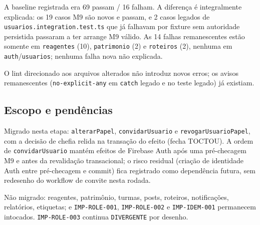 A baseline registrada era 69 passam / 16 falham. A diferença é integralmente
explicada: os 19 casos M9 são novos e passam, e 2 casos legados de
\texttt{usuarios.integration.test.ts} que já falhavam por fixture sem autoridade
persistida passaram a ter arrange M9 válido. As 14 falhas remanescentes estão
somente em \texttt{reagentes} (10), \texttt{patrimonio} (2) e \texttt{roteiros}
(2), nenhuma em \texttt{auth}/\texttt{usuarios}; nenhuma falha nova não explicada.

O lint direcionado aos arquivos alterados não introduz novos erros; os avisos
remanescentes (\texttt{no-explicit-any} em \texttt{catch} legado e no teste
legado) já existiam.

\subsection{Escopo e pendências}

Migrado nesta etapa: \texttt{alterarPapel}, \texttt{convidarUsuario} e
\texttt{revogarUsuarioPapel}, com a decisão de chefia relida na transação do
efeito (fecha TOCTOU). A ordem de \texttt{convidarUsuario} mantém efeitos de
Firebase Auth após uma pré-checagem M9 e antes da revalidação transacional; o
risco residual (criação de identidade Auth entre pré-checagem e commit) fica
registrado como dependência futura, sem redesenho do workflow de convite nesta
rodada.

Não migrado: reagentes, patrimônio, turmas, posts, roteiros, notificações,
relatórios, etiquetas; e \texttt{IMP-ROLE-001}, \texttt{IMP-ROLE-002} e
\texttt{IMP-IDEM-001} permanecem intocados. \texttt{IMP-ROLE-003} continua
\texttt{DIVERGENTE} por desenho.
